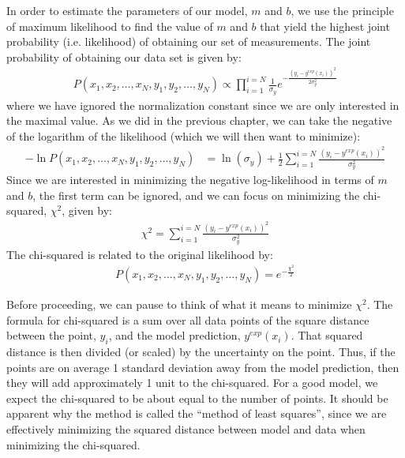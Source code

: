 In order to estimate the parameters of our model, $m$ and $b$, we use the principle of maximum likelihood to find the value of $m$ and $b$ that yield the highest joint probability (i.e. likelihood) of obtaining our set of measurements. The joint probability of obtaining our data set is given by:
\begin{align*}
P(x_1,x_2,\dots,x_N,y_1,y_2,\dots,y_N)\propto\prod_{i=1}^{i=N}\frac{1}{\sigma_{y}}e^{-\frac{(y_i-y^{exp}(x_i))^2}{2\sigma_{y}^2}}
\end{align*}
where we have ignored the normalization constant since we are only interested in the maximal value. As we did in the previous chapter, we can take the negative of the logarithm of the likelihood (which we will then want to minimize):
\begin{align}
-\ln{P(x_1,x_2,\dots,x_N,y_1,y_2,\dots,y_N)}&=\ln(\sigma_y)+\frac{1}{2}\sum_{i=1}^{i=N}\frac{(y_i-y^{exp}(x_i))^2}{\sigma_{y}^2}
\end{align}
Since we are interested in minimizing the negative log-likelihood in terms of $m$ and $b$, the first term can be ignored, and we can focus on minimizing the chi-squared, $\chi^2$, given by:
\begin{align}
\chi^2=\sum_{i=1}^{i=N}\frac{(y_i-y^{exp}(x_i))^2}{\sigma_{y}^2}
\end{align}
The chi-squared is related to the original likelihood by:
\begin{align}
\label{eqn:chilike}
P(x_1,x_2,\dots,x_N,y_1,y_2,\dots,y_N) = e^{-\frac{\chi^2}{2}}
\end{align}

Before proceeding, we can pause to think of what it means to minimize $\chi^2$. The formula for chi-squared is a sum over all data points of the square distance between the point, $y_i$, and the model prediction, $y^{exp}(x_i)$. That squared distance is then divided (or scaled) by the uncertainty on the point. Thus, if the points are on average 1 standard deviation away from the model prediction, then they will add approximately 1 unit to the chi-squared. For a good model, we expect the chi-squared to be about equal to the number of points. It should be apparent why the method is called the ``method of least squares'', since we are effectively minimizing the squared distance between model and data when minimizing the chi-squared.



